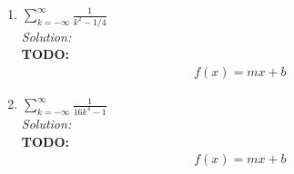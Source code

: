 \documentclass[10pt]{amsart}
\theoremstyle{nonumberplain}
\begin{document}
\begin{enumerate}[label={\bf {\arabic*}:}]
\begin{enumerate}
\begin{enumerate}
\item  $\displaystyle \sum_{k=-\infty}^{\infty} \frac{1}{k^2-1/4}$ \\
 
\noindent
\textit{Solution:} \\
\textbf{TODO:}
\begin{align*}
f(x) = mx + b
\end{align*}


\item  $\displaystyle \sum_{k=-\infty}^{\infty} \frac{1}{16k^4 -1}$ \\
 
\noindent
\textit{Solution:} \\
\textbf{TODO:}
\begin{align*}
f(x) = mx + b
\end{align*}


\end{enumerate}
\end{enumerate}

\end{enumerate}
  
\end{document}
